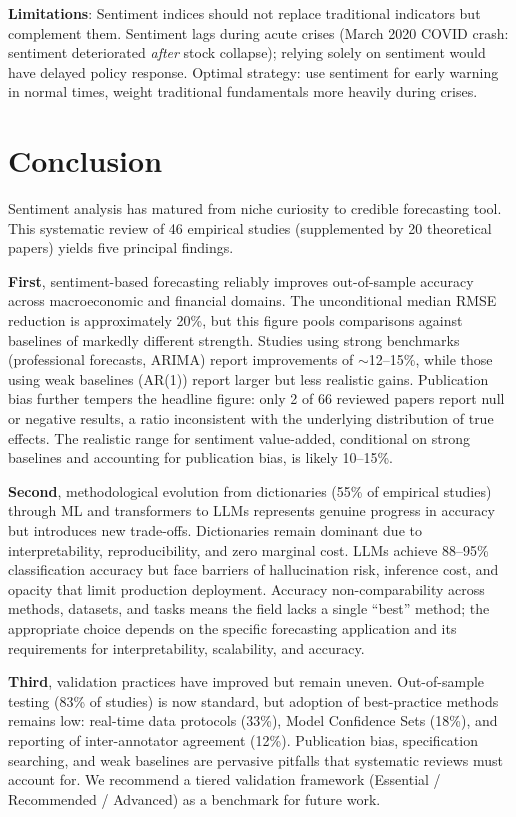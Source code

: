 \documentclass[11pt]{article}
\begin{document}
\textbf{Limitations}: Sentiment indices should not replace traditional indicators but complement them. Sentiment lags during acute crises (March 2020 COVID crash: sentiment deteriorated \emph{after} stock collapse); relying solely on sentiment would have delayed policy response. Optimal strategy: use sentiment for early warning in normal times, weight traditional fundamentals more heavily during crises.

\section{Conclusion}

Sentiment analysis has matured from niche curiosity to credible forecasting tool. This systematic review of 46 empirical studies (supplemented by 20 theoretical papers) yields five principal findings.

\textbf{First}, sentiment-based forecasting reliably improves out-of-sample accuracy across macroeconomic and financial domains. The unconditional median RMSE reduction is approximately 20\%, but this figure pools comparisons against baselines of markedly different strength. Studies using strong benchmarks (professional forecasts, ARIMA) report improvements of $\sim$12--15\%, while those using weak baselines (AR(1)) report larger but less realistic gains. Publication bias further tempers the headline figure: only 2 of 66 reviewed papers report null or negative results, a ratio inconsistent with the underlying distribution of true effects. The realistic range for sentiment value-added, conditional on strong baselines and accounting for publication bias, is likely 10--15\%.

\textbf{Second}, methodological evolution from dictionaries (55\% of empirical studies) through ML and transformers to LLMs represents genuine progress in accuracy but introduces new trade-offs. Dictionaries remain dominant due to interpretability, reproducibility, and zero marginal cost. LLMs achieve 88--95\% classification accuracy but face barriers of hallucination risk, inference cost, and opacity that limit production deployment. Accuracy non-comparability across methods, datasets, and tasks means the field lacks a single ``best'' method; the appropriate choice depends on the specific forecasting application and its requirements for interpretability, scalability, and accuracy.

\textbf{Third}, validation practices have improved but remain uneven. Out-of-sample testing (83\% of studies) is now standard, but adoption of best-practice methods remains low: real-time data protocols (33\%), Model Confidence Sets (18\%), and reporting of inter-annotator agreement (12\%). Publication bias, specification searching, and weak baselines are pervasive pitfalls that systematic reviews must account for. We recommend a tiered validation framework (Essential / Recommended / Advanced) as a benchmark for future work.
\end{document}
